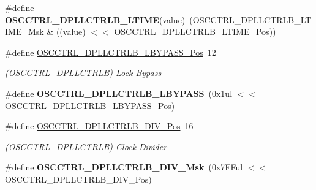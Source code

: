 \begin{DoxyCompactItemize}
\item 
\hypertarget{group___s_a_m_l21___o_s_c_c_t_r_l_gad2a4af1ec060f53b390b58a09b73d84d}{}\#define {\bfseries O\+S\+C\+C\+T\+R\+L\+\_\+\+D\+P\+L\+L\+C\+T\+R\+L\+B\+\_\+\+L\+T\+I\+M\+E}(value)~(O\+S\+C\+C\+T\+R\+L\+\_\+\+D\+P\+L\+L\+C\+T\+R\+L\+B\+\_\+\+L\+T\+I\+M\+E\+\_\+\+Msk \& ((value) $<$$<$ \hyperlink{group___s_a_m_l21___o_s_c_c_t_r_l_ga548d60cb7bc67169f8aae58e9172405d}{O\+S\+C\+C\+T\+R\+L\+\_\+\+D\+P\+L\+L\+C\+T\+R\+L\+B\+\_\+\+L\+T\+I\+M\+E\+\_\+\+Pos}))\label{group___s_a_m_l21___o_s_c_c_t_r_l_gad2a4af1ec060f53b390b58a09b73d84d}

\item 
\hypertarget{group___s_a_m_l21___o_s_c_c_t_r_l_ga7ea92e3e4b6ef826bbdc4b861343472d}{}\#define \hyperlink{group___s_a_m_l21___o_s_c_c_t_r_l_ga7ea92e3e4b6ef826bbdc4b861343472d}{O\+S\+C\+C\+T\+R\+L\+\_\+\+D\+P\+L\+L\+C\+T\+R\+L\+B\+\_\+\+L\+B\+Y\+P\+A\+S\+S\+\_\+\+Pos}~12\label{group___s_a_m_l21___o_s_c_c_t_r_l_ga7ea92e3e4b6ef826bbdc4b861343472d}

\begin{DoxyCompactList}\small\item\em (O\+S\+C\+C\+T\+R\+L\+\_\+\+D\+P\+L\+L\+C\+T\+R\+L\+B) Lock Bypass \end{DoxyCompactList}\item 
\hypertarget{group___s_a_m_l21___o_s_c_c_t_r_l_gab9064073606e5392f0ca50b20de58f9c}{}\#define {\bfseries O\+S\+C\+C\+T\+R\+L\+\_\+\+D\+P\+L\+L\+C\+T\+R\+L\+B\+\_\+\+L\+B\+Y\+P\+A\+S\+S}~(0x1ul $<$$<$ O\+S\+C\+C\+T\+R\+L\+\_\+\+D\+P\+L\+L\+C\+T\+R\+L\+B\+\_\+\+L\+B\+Y\+P\+A\+S\+S\+\_\+\+Pos)\label{group___s_a_m_l21___o_s_c_c_t_r_l_gab9064073606e5392f0ca50b20de58f9c}

\item 
\hypertarget{group___s_a_m_l21___o_s_c_c_t_r_l_ga4be649bdf3f99bbda9c530dbfadd27ef}{}\#define \hyperlink{group___s_a_m_l21___o_s_c_c_t_r_l_ga4be649bdf3f99bbda9c530dbfadd27ef}{O\+S\+C\+C\+T\+R\+L\+\_\+\+D\+P\+L\+L\+C\+T\+R\+L\+B\+\_\+\+D\+I\+V\+\_\+\+Pos}~16\label{group___s_a_m_l21___o_s_c_c_t_r_l_ga4be649bdf3f99bbda9c530dbfadd27ef}

\begin{DoxyCompactList}\small\item\em (O\+S\+C\+C\+T\+R\+L\+\_\+\+D\+P\+L\+L\+C\+T\+R\+L\+B) Clock Divider \end{DoxyCompactList}\item 
\hypertarget{group___s_a_m_l21___o_s_c_c_t_r_l_gad610fd5d53f1f2703ae5e8b1438391c6}{}\#define {\bfseries O\+S\+C\+C\+T\+R\+L\+\_\+\+D\+P\+L\+L\+C\+T\+R\+L\+B\+\_\+\+D\+I\+V\+\_\+\+Msk}~(0x7\+F\+Ful $<$$<$ O\+S\+C\+C\+T\+R\+L\+\_\+\+D\+P\+L\+L\+C\+T\+R\+L\+B\+\_\+\+D\+I\+V\+\_\+\+Pos)\label{group___s_a_m_l21___o_s_c_c_t_r_l_gad610fd5d53f1f2703ae5e8b1438391c6}


\end{DoxyCompactItemize}

